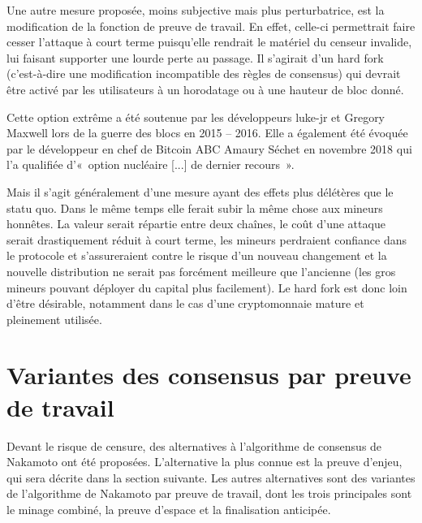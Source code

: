 
Une autre mesure proposée, moins subjective mais plus perturbatrice, est la modification de la fonction de preuve de travail. En effet, celle-ci permettrait faire cesser l'attaque à court terme puisqu'elle rendrait le matériel du censeur invalide, lui faisant supporter une lourde perte au passage. Il s'agirait d'un hard fork (c'est-à-dire une modification incompatible des règles de consensus) qui devrait être activé par les utilisateurs à un horodatage ou à une hauteur de bloc donné.

Cette option extrême a été soutenue par les développeurs luke-jr et Gregory Maxwell lors de la guerre des blocs en 2015 -- 2016. Elle a également été évoquée par le développeur en chef de Bitcoin ABC Amaury Séchet en novembre 2018 qui l'a qualifiée d'«~option nucléaire [...] de dernier recours~».

Mais il s'agit généralement d'une mesure ayant des effets plus délétères que le statu quo. Dans le même temps elle ferait subir la même chose aux mineurs honnêtes. La valeur serait répartie entre deux chaînes, le coût d'une attaque serait drastiquement réduit à court terme, les mineurs perdraient confiance dans le protocole et s'assureraient contre le risque d'un nouveau changement et la nouvelle distribution ne serait pas forcément meilleure que l'ancienne (les gros mineurs pouvant déployer du capital plus facilement). Le hard fork est donc loin d'être désirable, notamment dans le cas d'une cryptomonnaie mature et pleinement utilisée.

\section*{Variantes des consensus par preuve de travail}

Devant le risque de censure, des alternatives à l'algorithme de consensus de Nakamoto ont été proposées. L'alternative la plus connue est la preuve d'enjeu, qui sera décrite dans la section suivante. Les autres alternatives sont des variantes de l'algorithme de Nakamoto par preuve de travail, dont les trois principales sont le minage combiné, la preuve d'espace et la finalisation anticipée. %

